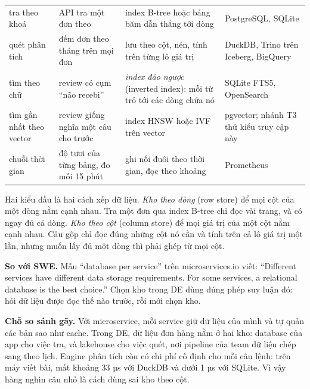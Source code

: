 \begin{xltabular}{\textwidth}{@{}P{2.6cm} P{3.6cm} L P{3.2cm}@{}}
\toprule
{} &  &  &  \\
\midrule
\endhead
\bottomrule
\endfoot
tra theo khoá & API tra một đơn theo  & index B-tree hoặc bảng băm dẫn thẳng tới dòng & PostgreSQL, SQLite \\
quét phân tích & đếm đơn theo tháng trên mọi đơn & lưu theo cột, nén, tính trên từng lô giá trị & DuckDB, Trino trên Iceberg, BigQuery \\
tìm theo chữ & review có cụm ``não recebi'' & \textit{index đảo ngược} (inverted index): mỗi từ trỏ tới các dòng chứa nó & SQLite FTS5, OpenSearch \\
tìm gần nhất theo vector & review giống nghĩa một câu cho trước & index HNSW hoặc IVF trên vector & pgvector; nhánh T3 thử kiểu truy cập này \\
chuỗi thời gian & độ tươi của từng bảng, đo mỗi 15 phút & ghi nối đuôi theo thời gian, đọc theo khoảng & Prometheus \\
\end{xltabular}

Hai kiểu đầu là hai cách xếp dữ liệu. \textit{Kho theo dòng} (row store) để mọi cột của một dòng nằm cạnh nhau. Tra một đơn qua index B-tree chỉ đọc vài trang, và có ngay đủ cả dòng. \textit{Kho theo cột} (column store) để mọi giá trị của một cột nằm cạnh nhau. Câu gộp chỉ đọc đúng những cột nó cần và tính trên cả lô giá trị một lần, nhưng muốn lấy đủ một dòng thì phải ghép từ mọi cột.

\begin{ghichu}
\textbf{So với SWE.} Mẫu ``database per service'' trên microservices.io viết: ``Different services have different data storage requirements. For some services, a relational database is the best choice.'' Chọn kho trong DE dùng đúng phép suy luận đó: hỏi dữ liệu được đọc thế nào trước, rồi mới chọn kho.

\textbf{Chỗ so sánh gãy.} Với microservice, mỗi service giữ dữ liệu của mình và tự quản các bản sao như cache. Trong DE, dữ liệu đơn hàng nằm ở hai kho: database của app cho việc tra, và lakehouse cho việc quét, nơi pipeline của team dữ liệu chép sang theo lịch. Engine phân tích còn có chi phí cố định cho mỗi câu lệnh: trên máy viết bài,  mất khoảng 33 µs với DuckDB và dưới 1 µs với SQLite. Vì vậy hàng nghìn câu nhỏ là cách dùng sai kho theo cột.
\end{ghichu}


